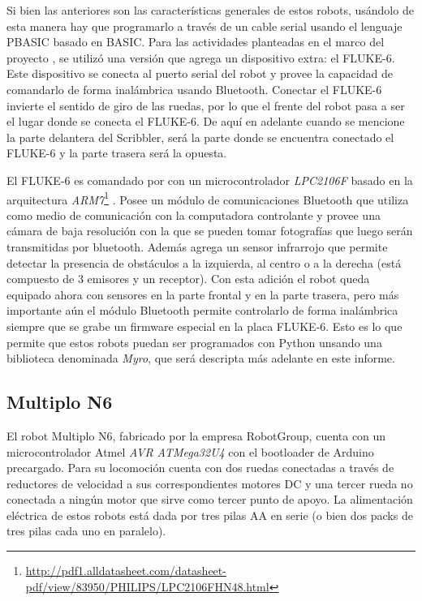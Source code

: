 Si bien las anteriores son las características generales de estos robots, usándolo
de esta manera hay que programarlo a través de un cable serial usando el
lenguaje PBASIC basado en BASIC. Para las actividades planteadas en el marco del
proyecto \proyecto{}, se utilizó  una versión
que agrega un dispositivo extra: el FLUKE-6. Este dispositivo se conecta al puerto
serial del robot y provee la capacidad de comandarlo de forma inalámbrica
usando Bluetooth.  Conectar el
FLUKE-6 invierte el sentido de giro de las ruedas, por lo que el frente
del robot pasa a ser el lugar donde se conecta el FLUKE-6. De aquí
en adelante cuando se mencione la parte delantera del Scribbler, será la
parte donde se encuentra conectado el FLUKE-6 y la parte trasera será la
opuesta.

El FLUKE-6 es comandado por con un microcontrolador \textit{LPC2106F} basado
en la arquitectura
\textit{ARM7}\footnote{\url{http://pdf1.alldatasheet.com/datasheet-pdf/view/83950/PHILIPS/LPC2106FHN48.html}}
. Posee un módulo de comunicaciones
Bluetooth que utiliza como medio de comunicación con la computadora
controlante y
provee una cámara de baja resolución con la que se pueden tomar fotografías
que luego serán transmitidas por bluetooth. Además agrega
un sensor infrarrojo que permite detectar la presencia de obstáculos
a la izquierda, al centro o a la derecha (está compuesto de 3 emisores
y un receptor). Con esta adición el robot queda equipado ahora con sensores
en la parte frontal y en la parte trasera, pero más importante aún
el módulo Bluetooth permite controlarlo de forma inalámbrica siempre
que se grabe un firmware especial en la placa FLUKE-6. Esto es lo que permite
que estos robots puedan ser programados con Python unsando una  biblioteca denominada
\textit{Myro}, que será descripta más adelante en este informe.

\subsection{Multiplo N6}
El robot Multiplo N6, fabricado por la empresa RobotGroup, cuenta con un
microcontrolador Atmel \textit{AVR ATMega32U4} con el bootloader de Arduino
precargado. Para su locomoción cuenta con dos ruedas conectadas a través
de reductores de velocidad a sus correspondientes motores DC y una tercer
rueda no conectada a ningún motor que sirve como tercer punto de apoyo.
La alimentación eléctrica de estos robots está dada por tres pilas AA
en serie (o bien dos packs de tres pilas cada uno en paralelo).

